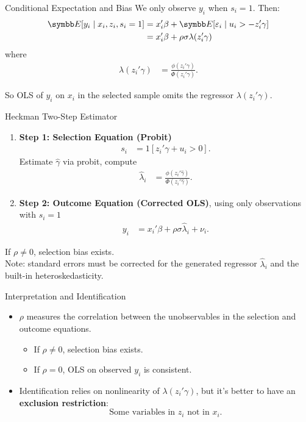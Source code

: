 \documentclass[aspectratio=169,11pt]{beamer}
\begin{document}
\begin{frame}{Conditional Expectation and Bias}
We only observe $y_i$ when $s_i = 1$. Then:
\begin{align*}
\E[y_i \mid x_i, z_i, s_i=1]
    &= x_i'\beta + \E[\varepsilon_i \mid u_i > -z_i'\gamma] \\
    &= x_i'\beta + \rho \sigma \lambda(z_i'\gamma)
\end{align*}
where
\begin{align*}
\lambda(z_i'\gamma)
    &= \frac{\phi(z_i'\gamma)}{\Phi(z_i'\gamma)}.
\end{align*}

So OLS of $y_i$ on $x_i$ in the selected sample omits the regressor $\lambda(z_i'\gamma)$.
\end{frame}

\begin{frame}{Heckman Two-Step Estimator}
\begin{enumerate}
    \item \textbf{Step 1: Selection Equation (Probit)}
    \begin{align*}
    s_i &= 1[z_i'\gamma + u_i > 0].
    \end{align*}
    Estimate $\hat{\gamma}$ via probit, compute
    \begin{align*}
    \hat{\lambda}_i &= \frac{\phi(z_i'\hat{\gamma})}{\Phi(z_i'\hat{\gamma})}.
    \end{align*}
    \item \textbf{Step 2: Outcome Equation (Corrected OLS)}, using only observations with $s_i=1$
    \begin{align*}
    y_i &= x_i'\beta + \rho\sigma \hat{\lambda}_i + \nu_i.
    \end{align*}
\end{enumerate}

If $\rho \neq 0$, selection bias exists.\\
\vspace{0.2cm}
Note: standard errors must be corrected for the generated regressor $\hat{\lambda}_i$ and the built-in heteroskedasticity.
\end{frame}


\begin{frame}{Interpretation and Identification}
\begin{itemize}
    \item $\rho$ measures the correlation between the unobservables in the selection and outcome equations.
    \begin{itemize}
        \item If $\rho \neq 0$, selection bias exists.
        \item If $\rho = 0$, OLS on observed $y_i$ is consistent.
    \end{itemize}
    \item Identification relies on nonlinearity of $\lambda(z_i'\gamma)$, but it's better to have an \textbf{exclusion restriction}:
    \[
    \text{Some variables in } z_i \text{ not in } x_i.
    \]
\end{itemize}
\end{frame}
\end{document}
